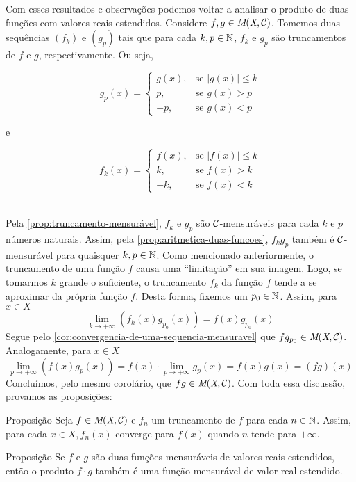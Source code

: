 Com esses resultados e observações podemos voltar a analisar o produto de duas funções com valores reais estendidos.
Considere $f,g \in \operatorname{\textit{M}(\textit{X}, \mathcal{C} )}$. 
Tomemos duas sequências $(f_k)$ e $(g_p)$ tais que para cada $k,p \in \operatorname{\mathbb{N}}$, $f_k$ e $g_p$ são truncamentos de $f$ e $g$, respectivamente.
Ou seja,
	\begin{minipage}{0.5\linewidth}
	$$ g_p(x) =
	\left\{\begin{array}{cc}
		g(x), & \textrm{se\ } |g(x)| \leq k \\
		p, & \textrm{se\ } g(x) > p \\
		-p, & \textrm{se\ } g(x) < p 
	\end{array}\right.	
	$$	
	\end{minipage}
e
	\begin{minipage}{0.5\linewidth}
		$$ f_k(x) =
		\left\{\begin{array}{cc}
			f(x), & \textrm{se\ } |f(x)| \leq k \\
			k, & \textrm{se\ } f(x) > k \\
			-k, & \textrm{se\ } f(x) < k 
		\end{array}\right.	
		$$	
	\end{minipage}
\\
Pela \ref{prop:truncamento-mensurável}, $f_k$ e $g_p$ são $\operatorname{\mathcal{C}}$-mensuráveis para cada $k$ e $p$ números naturais.
Assim, pela \ref{prop:aritmetica-duas-funcoes}, $f_kg_p$ também é $\operatorname{\mathcal{C}}$-mensurável para quaisquer $k, p \in \operatorname{\mathbb{N}}$.
Como mencionado anteriormente, o truncamento de uma função $f$ causa uma \enquote{limitação} em sua imagem.
Logo, se tomarmos $k$ grande o suficiente, o truncamento $f_k$ da função $f$ tende a se aproximar da própria função $f$.
Desta forma, fixemos um $p_0 \in \operatorname{\mathbb{N}}$.
Assim, para $x \in X$
$$
\lim_{k \to +\infty} \left(f_k(x)g_{p_0}(x)\right) = f(x)g_{p_0}(x) 
$$
Segue pelo \ref{cor:convergencia-de-uma-sequencia-mensuravel} que 
$fg_{p_0} \in \operatorname{\textit{M}(\textit{X}, \mathcal{C} )}$. 
Analogamente, para $x \in X$
$$
\lim_{p \to +\infty} \left(f(x)g_p(x)\right) 
=
f(x)\cdot\lim_{p \to +\infty} g_p(x) 
= f(x)g(x) = (fg)(x)
$$
Concluímos, pelo mesmo corolário, que $fg \in \operatorname{\textit{M}(\textit{X}, \mathcal{C} )}$.
Com toda essa discussão, provamos as proposições:

\begin{env}{Proposição}
	\label{prop:convergencia do truncamento}
	Seja $f \in \operatorname{\textit{M}(\textit{X}, \mathcal{C} )}$ e $f_n$ um truncamento de $f$ para cada $n \in \operatorname{\mathbb{N}}$. 
	Assim, para cada $x \in X, f_n(x)$ converge para $f(x)$ quando $n$ tende para $+\infty$.
\end{env}
\begin{env}{Proposição}
	\label{prop:produto de funções reais mensuraveis estendidas}
	Se $f$ e $g$ são duas funções mensuráveis de valores reais estendidos, então o produto $f \cdot g$ também é uma função mensurável de valor real estendido.
\end{env}


